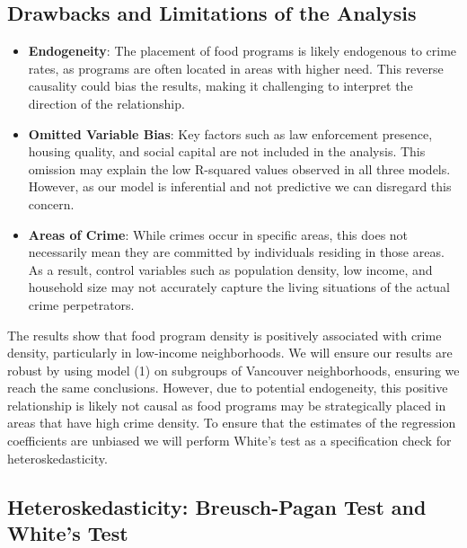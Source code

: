 \documentclass[AEJ]{AEA}
\begin{document}
\subsection{Drawbacks and Limitations of the Analysis}

\begin{itemize}
    \item \textbf{Endogeneity}: The placement of food programs is likely endogenous to crime rates, as programs are often located in areas with higher need. This reverse causality could bias the results, making it challenging to interpret the direction of the relationship.

    \item \textbf{Omitted Variable Bias}: Key factors such as law enforcement presence, housing quality, and social capital are not included in the analysis. This omission may explain the low R-squared values observed in all three models. However, as our model is inferential and not predictive we can disregard this concern.

    \item \textbf{Areas of Crime}: While crimes occur in specific areas, this does not necessarily mean they are committed by individuals residing in those areas. As a result, control variables such as population density, low income, and household size may not accurately capture the living situations of the actual crime perpetrators.
\end{itemize}

The results show that food program density is positively associated with crime density, particularly in low-income neighborhoods.  We will ensure our results are robust by using model (1) on subgroups of Vancouver neighborhoods, ensuring we reach the same conclusions. However, due to potential endogeneity, this positive relationship is likely not causal as food programs may be strategically placed in areas that have high crime density. 
To ensure that the estimates of the regression coefficients are unbiased we will perform White’s test as a specification check for heteroskedasticity.

\subsection{Heteroskedasticity: Breusch-Pagan Test and White’s Test} 
\end{document}
